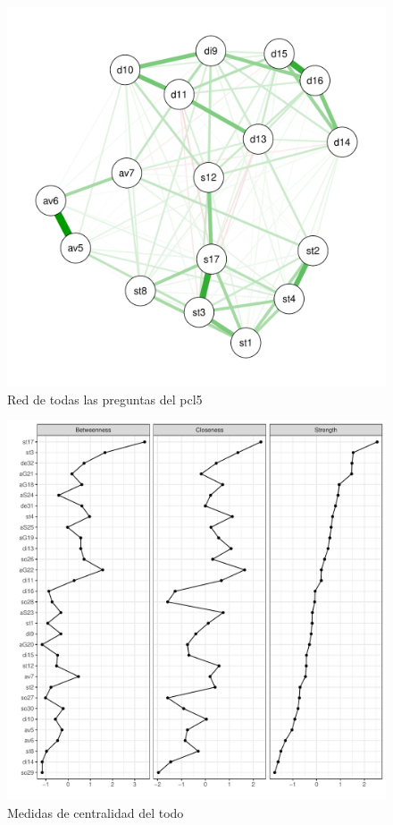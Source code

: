 \documentclass[11pt,spanish]{article}\usepackage[]{graphicx}\usepackage[]{color}
\begin{document}
\begin{figure}[ht]
\centering
\includegraphics[scale=0.7]{images/net_pcl5.pdf}
\caption{Red de todas las preguntas del pcl5}
\label{fig:red_pcl5}
\end{figure}


\begin{figure}[ht]
\centering
\includegraphics[scale=0.7]{images/centrality_net_todo.pdf}
\caption{Medidas de centralidad del todo}
\label{fig:centra_todo}
\end{figure}
\end{document}
